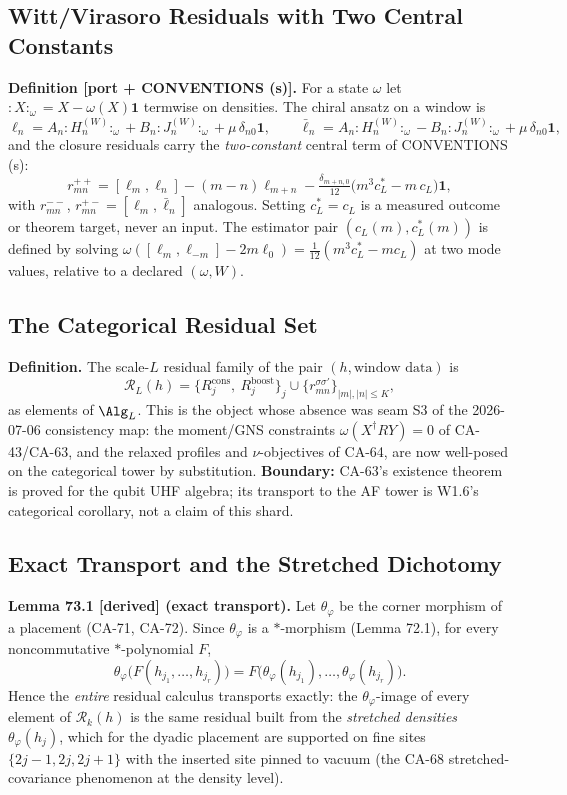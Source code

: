 \subsection{Witt/Virasoro Residuals with Two Central Constants}

\textbf{Definition [port + CONVENTIONS (s)].}  For a state \(\omega\) let
\({:}X{:}_\omega=X-\omega(X)\mathbf 1\) termwise on densities.  The chiral
ansatz on a window is
\[
  \ell_n=A_n{:}H_n^{(W)}{:}_\omega+B_n{:}J_n^{(W)}{:}_\omega
  +\mu\,\delta_{n0}\mathbf 1,
  \qquad
  \bar\ell_n=A_n{:}H_n^{(W)}{:}_\omega-B_n{:}J_n^{(W)}{:}_\omega
  +\mu\,\delta_{n0}\mathbf 1,
\]
and the closure residuals carry the \emph{two-constant} central term of
CONVENTIONS (s):
\[
  r^{++}_{mn}=[\ell_m,\ell_n]-(m-n)\ell_{m+n}
  -\tfrac{\delta_{m+n,0}}{12}\bigl(m^3c^*_L-m\,c_L\bigr)\mathbf 1,
\]
with \(r^{--}_{mn}\), \(r^{+-}_{mn}=[\ell_m,\bar\ell_n]\) analogous.
Setting \(c^*_L=c_L\) is a measured outcome or theorem target, never an
input.  The estimator pair \((c_L(m),c^*_L(m))\) is defined by solving
\(\omega([\ell_m,\ell_{-m}]-2m\ell_0)=\tfrac1{12}(m^3c^*_L-mc_L)\) at two
mode values, relative to a declared \((\omega,W)\).

\subsection{The Categorical Residual Set}

\textbf{Definition.}  The scale-\(L\) residual family of the pair
\((h,\text{window data})\) is
\[
  \mathcal R_L(h)=
  \bigl\{R^{\mathrm{cons}}_j,\ R^{\mathrm{boost}}_j\bigr\}_{j}
  \cup
  \bigl\{r^{\sigma\sigma'}_{mn}\bigr\}_{|m|,|n|\le K},
\]
as elements of \(\Alg_L\).  This is the object whose absence was seam S3 of
the 2026-07-06 consistency map: the moment/GNS constraints
\(\omega(X^\dagger RY)=0\) of CA-43/CA-63, and the relaxed profiles and
\(\nu\)-objectives of CA-64, are now well-posed on the categorical tower by
substitution.  \textbf{Boundary:} CA-63's existence theorem is proved for
the qubit UHF algebra; its transport to the AF tower is W1.6's categorical
corollary, not a claim of this shard.

\subsection{Exact Transport and the Stretched Dichotomy}

\textbf{Lemma 73.1 [derived] (exact transport).}  Let
\(\theta_\varphi\) be the corner morphism of a placement (CA-71, CA-72).
Since \(\theta_\varphi\) is a \(*\)-morphism (Lemma 72.1), for every
noncommutative \(*\)-polynomial \(F\),
\[
  \theta_\varphi\bigl(F(h_{j_1},\dots,h_{j_r})\bigr)
  =F\bigl(\theta_\varphi(h_{j_1}),\dots,\theta_\varphi(h_{j_r})\bigr).
\]
Hence the \emph{entire} residual calculus transports exactly: the
\(\theta_\varphi\)-image of every element of \(\mathcal R_k(h)\) is the
same residual built from the \emph{stretched densities}
\(\theta_\varphi(h_j)\), which for the dyadic placement are supported on
fine sites \(\{2j-1,2j,2j+1\}\) with the inserted site pinned to vacuum
(the CA-68 stretched-covariance phenomenon at the density level).

